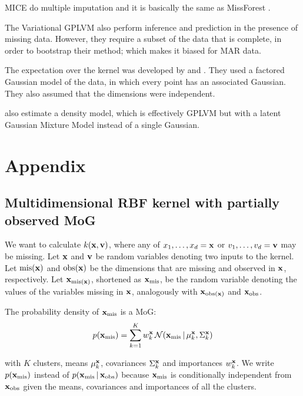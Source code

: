 \documentclass[letterpaper]{article}
\newcommand{\vbar}{\,|\,}
\newcommand{\vx}{{\bf x}}
\newcommand{\vv}{{\bf v}}
\begin{document}
MICE do multiple imputation and it is basically the same as MissForest
\citep{van1999flexible}.

The Variational \ac{GPLVM} \citep{damianou2016variational} also perform
inference and prediction in the presence of missing data. However, they require
a subset of the data that is complete, in order to bootstrap their method; which
makes it biased for MAR data.


The expectation over the kernel was developed by \citet{nebot2010kernel} and
\citet{hernandez2015study}. They used a factored Gaussian model of the data, in
which every point has an associated Gaussian. They also assumed that the
dimensions were independent.


\citet{iwata2012warped} also estimate a density model, which is effectively
\ac{GPLVM} but with a latent Gaussian Mixture Model instead of a single
Gaussian.



\section{Appendix}

\subsection{Multidimensional \ac{RBF} kernel with partially observed \ac{MoG}}
We want to calculate $k(\vx, \vv)$, where any of $x_1,\dots,x_d = \vx$ or
$v_1,\dots,v_d = \vv$ may be missing. Let $\vx$ and $\vv$ be random variables denoting
two inputs to the kernel. Let $\text{mis}(\vx)$ and $\text{obs}(\vx)$ be the
dimensions that are missing and observed in $\vx$, respectively. Let
$\vx_{\text{mis}(\vx)}$, shortened as $\vx_\text{mis}$, be the random variable
denoting the values of the variables missing in $\vx$, analogously with
$\vx_{\text{obs}(\vx)}$ and $\vx_\text{obs}$.

The probability density of $\vx_\text{mis}$ is a \acl{MoG}:
\begin{equation*}
  p(\vx_\text{mis} ) = \sum_{k=1}^K w^\vx_k \, \mathcal{N}(\vx_\text{mis} \vbar \mu_k^\vx, \Sigma_k^\vx)
\end{equation*}

with $K$ clusters, means $\mu_k^\vx$, covariances $\Sigma_k^\vx$ and importances
$w_k^\vx$. We write $p(\vx_\text{mis})$ instead of $p(\vx_\text{mis} \vbar
\vx_\text{obs})$ because $\vx_\text{mis}$ is conditionally independent from
$\vx_\text{obs}$ given the means, covariances and importances of all the
clusters.
\end{document}
